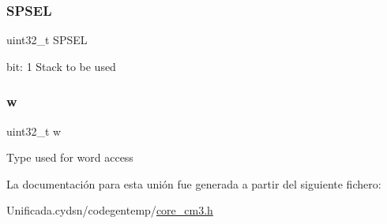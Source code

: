 \subsubsection{\texorpdfstring{S\+P\+S\+EL}{SPSEL}}
{\footnotesize\ttfamily uint32\+\_\+t S\+P\+S\+EL}

bit\+: 1 Stack to be used \mbox{\label{union_c_o_n_t_r_o_l___type_ad0fb62e7a08e70fc5e0a76b67809f84b}} 
\subsubsection{\texorpdfstring{w}{w}}
{\footnotesize\ttfamily uint32\+\_\+t w}

Type used for word access 

La documentación para esta unión fue generada a partir del siguiente fichero\+:\begin{DoxyCompactItemize}
\item 
Unificada.\+cydsn/codegentemp/\mbox{\hyperlink{core__cm3_8h}{core\+\_\+cm3.\+h}}\end{DoxyCompactItemize}
